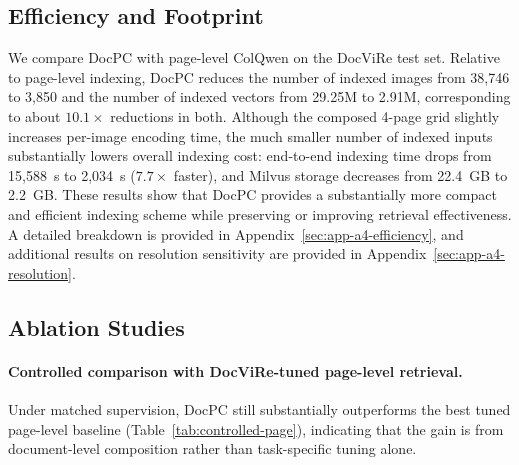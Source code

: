 
\subsection{Efficiency and Footprint}
\label{sec:efficiency-footprint}

We compare DocPC with page-level ColQwen on the DocViRe test set.
Relative to page-level indexing, DocPC reduces the number of indexed images from 38{,}746 to 3{,}850 and the number of indexed vectors from 29.25M to 2.91M, corresponding to about $10.1\times$ reductions in both.
Although the composed 4-page grid slightly increases per-image encoding time, the much smaller number of indexed inputs substantially lowers overall indexing cost: end-to-end indexing time drops from 15{,}588~s to 2{,}034~s ($7.7\times$ faster), and Milvus storage decreases from 22.4~GB to 2.2~GB.
These results show that DocPC provides a substantially more compact and efficient indexing scheme while preserving or improving retrieval effectiveness.
A detailed breakdown is provided in Appendix~\ref{sec:app-a4-efficiency}, and additional results on resolution sensitivity are provided in Appendix~\ref{sec:app-a4-resolution}.

\subsection{Ablation Studies}
\label{sec:ablation}

\paragraph{Controlled comparison with DocViRe-tuned page-level retrieval.}
Under matched supervision, DocPC still substantially outperforms the best tuned page-level baseline (Table~\ref{tab:controlled-page}), indicating that the gain is from document-level composition rather than task-specific tuning alone.

